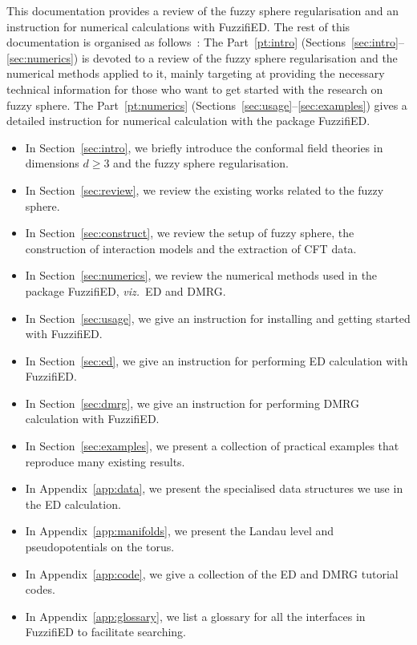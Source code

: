 \documentclass{timesjhep}
\begin{document}
This documentation provides a review of the fuzzy sphere regularisation and an instruction for numerical calculations with FuzzifiED. The rest of this documentation is organised as follows~: The Part~\ref{pt:intro} (Sections~\ref{sec:intro}--\ref{sec:numerics}) is devoted to a review of the fuzzy sphere regularisation and the numerical methods applied to it, mainly targeting at providing the necessary technical information for those who want to get started with the research on fuzzy sphere. The Part~\ref{pt:numerics} (Sections~\ref{sec:usage}--\ref{sec:examples}) gives a detailed instruction for numerical calculation with the package FuzzifiED. 
\begin{itemize}
    \item In Section~\ref{sec:intro}, we briefly introduce the conformal field theories in dimensions $d\ge 3$ and the fuzzy sphere regularisation. 
    \item In Section~\ref{sec:review}, we review the existing works related to the fuzzy sphere. 
    \item In Section~\ref{sec:construct}, we review the setup of fuzzy sphere, the construction of interaction models and the extraction of CFT data.
    \item In Section~\ref{sec:numerics}, we review the numerical methods used in the package FuzzifiED, \textit{viz.}~ED and DMRG. 
    \item In Section~\ref{sec:usage}, we give an instruction for installing and getting started with FuzzifiED. 
    \item In Section~\ref{sec:ed}, we give an instruction for performing ED calculation with FuzzifiED. 
    \item In Section~\ref{sec:dmrg}, we give an instruction for performing DMRG calculation with FuzzifiED. 
    \item In Section~\ref{sec:examples}, we present a collection of practical examples that reproduce many existing results.
    \item In Appendix~\ref{app:data}, we present the specialised data structures we use in the ED calculation. 
    \item In Appendix~\ref{app:manifolds}, we present the Landau level and pseudopotentials on the torus. 
    \item In Appendix~\ref{app:code}, we give a collection of the ED and DMRG tutorial codes.
    \item In Appendix~\ref{app:glossary}, we list a glossary for all the interfaces in FuzzifiED to facilitate searching. 
\end{itemize}
\end{document}
